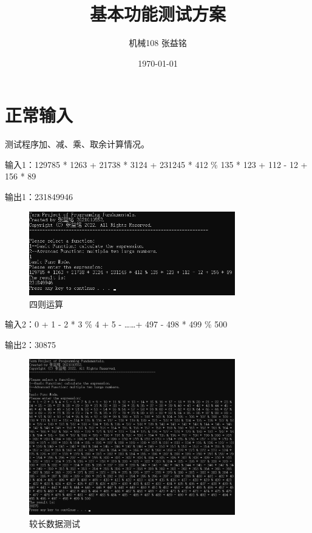 \documentclass[a4paper, 11pt, UTF8]{ctexart}
\title{基本功能测试方案}
\author{机械108 \qquad 张益铭 \qquad 2021010552}
\date{\today}
\begin{document}
\maketitle

\tableofcontents


\newpage

\section{正常输入}

测试程序加、减、乘、取余计算情况。

输入1：129785 * 1263 + 21738 * 3124 + 231245 * 412 \% 135 * 123 + 112 - 12 + 156 * 89

输出1：231849946

\begin{figure}[H]
    \centering
    \caption{四则运算}
    \includegraphics[width=0.8\textwidth]{t1.png}    
\end{figure}

输入2：0 + 1 - 2 * 3 \% 4 + 5 - \dots\dots + 497 - 498 * 499 \% 500

输出2：30875

\begin{figure}[H]
    \centering
    \caption{较长数据测试}
    \includegraphics[width=0.8\textwidth]{t2.png}    
\end{figure}
\end{document}
